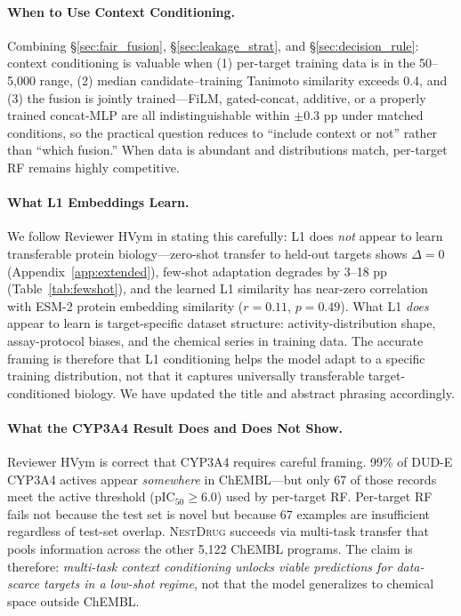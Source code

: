 \documentclass{article}
\newcommand{\methodname}{\textsc{NestDrug}}
\begin{document}
\paragraph{When to Use Context Conditioning.}
Combining \S\ref{sec:fair_fusion}, \S\ref{sec:leakage_strat}, and \S\ref{sec:decision_rule}: context conditioning is valuable when (1) per-target training data is in the 50--5{,}000 range, (2) median candidate--training Tanimoto similarity exceeds 0.4, and (3) the fusion is jointly trained---FiLM, gated-concat, additive, or a properly trained concat-MLP are all indistinguishable within $\pm 0.3$ pp under matched conditions, so the practical question reduces to ``include context or not'' rather than ``which fusion.'' When data is abundant and distributions match, per-target RF remains highly competitive.

\paragraph{What L1 Embeddings Learn.}
We follow Reviewer HVym in stating this carefully: L1 does \emph{not} appear to learn transferable protein biology---zero-shot transfer to held-out targets shows $\Delta = 0$ (Appendix~\ref{app:extended}), few-shot adaptation degrades by 3--18 pp (Table~\ref{tab:fewshot}), and the learned L1 similarity has near-zero correlation with ESM-2 protein embedding similarity ($r = 0.11$, $p = 0.49$). What L1 \emph{does} appear to learn is target-specific dataset structure: activity-distribution shape, assay-protocol biases, and the chemical series in training data. The accurate framing is therefore that L1 conditioning helps the model adapt to a specific training distribution, not that it captures universally transferable target-conditioned biology. We have updated the title and abstract phrasing accordingly.

\paragraph{What the CYP3A4 Result Does and Does Not Show.}
Reviewer HVym is correct that CYP3A4 requires careful framing. 99\% of DUD-E CYP3A4 actives appear \emph{somewhere} in ChEMBL---but only 67 of those records meet the active threshold (pIC$_{50} \geq 6.0$) used by per-target RF. Per-target RF fails not because the test set is novel but because 67 examples are insufficient regardless of test-set overlap. \methodname{} succeeds via multi-task transfer that pools information across the other 5{,}122 ChEMBL programs. The claim is therefore: \textit{multi-task context conditioning unlocks viable predictions for data-scarce targets in a low-shot regime}, not that the model generalizes to chemical space outside ChEMBL.
\end{document}
